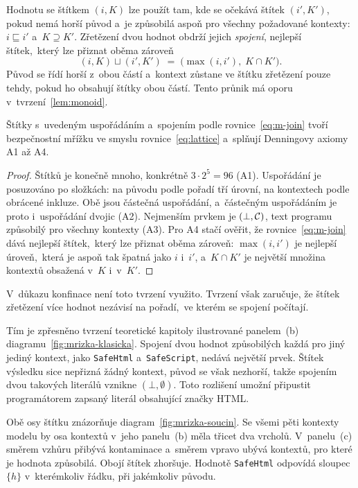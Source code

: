 Hodnotu se štítkem $(i,K)$ lze použít tam, kde se očekává štítek $(i',K')$, pokud nemá horší původ a~je způsobilá aspoň pro všechny požadované kontexty: $i \sqsubseteq i'$ a~$K \supseteq K'$. Zřetězení dvou hodnot obdrží jejich \emph{spojení}, nejlepší štítek,~který lze přiznat oběma zároveň
\begin{equation}
    (i,K) \sqcup (i',K') \;=\; \bigl(\max(i,i'),\; K \cap K'\bigr).
    \label{eq:m-join}
\end{equation}
Původ se řídí horší z~obou částí a~kontext zůstane ve štítku zřetězení pouze tehdy, pokud ho obsahují štítky obou částí. Tento průnik má oporu v~tvrzení~\ref{lem:monoid}.

\begin{tvrzeni}
\label{lem:mrizka}
Štítky s~uvedeným uspořádáním a~spojením podle rovnice~\ref{eq:m-join} tvoří bezpečnostní mřížku ve smyslu rovnice~\ref{eq:lattice} a~splňují Denningovy axiomy A1 až A4.
\end{tvrzeni}

\begin{proof}
Štítků je konečně mnoho, konkrétně $3 \cdot 2^5 = 96$ (A1). Uspořádání je posuzováno po složkách: na původu podle pořadí tří úrovní, na kontextech podle obrácené inkluze. Obě jsou částečná uspořádání, a~částečným uspořádáním je proto i~uspořádání dvojic (A2). Nejmenším prvkem je $(\bot, \mathcal{C})$, text programu způsobilý pro všechny kontexty (A3). Pro A4 stačí ověřit, že rovnice~\ref{eq:m-join} dává nejlepší štítek,~který lze přiznat oběma zároveň: $\max(i,i')$ je nejlepší úroveň,~která je aspoň tak špatná jako $i$ i~$i'$, a~$K \cap K'$ je největší množina kontextů obsažená v~$K$ i~v~$K'$.
\end{proof}

V~důkazu konfinace není toto tvrzení využito. Tvrzení však zaručuje, že štítek zřetězení více hodnot nezávisí na pořadí,~ve kterém se spojení počítají.

Tím je zpřesněno tvrzení teoretické kapitoly ilustrované panelem~(b) diagramu~\ref{fig:mrizka-klasicka}. Spojení dvou hodnot způsobilých každá pro jiný jediný kontext, jako \texttt{SafeHtml} a~\texttt{SafeScript}, nedává největší prvek. Štítek výsledku sice nepřizná žádný kontext, původ se však nezhorší, takže spojením dvou takových literálů vznikne $(\bot, \emptyset)$. Toto rozlišení umožní připustit programátorem zapsaný literál obsahující značky HTML.

Obě osy štítku znázorňuje diagram~\ref{fig:mrizka-soucin}. Se všemi pěti kontexty modelu by osa kontextů v~jeho panelu~(b) měla třicet dva vrcholů. V~panelu~(c) směrem vzhůru přibývá kontaminace a~směrem vpravo ubývá kontextů, pro které je hodnota způsobilá. Obojí štítek zhoršuje. Hodnotě \texttt{SafeHtml} odpovídá sloupec~$\{h\}$ v~kterémkoliv řádku, při jakémkoliv původu.

